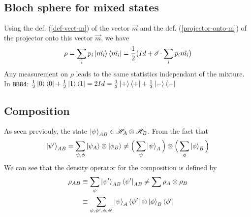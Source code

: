 \documentclass{article}
\begin{document}
\subsection{Bloch sphere for mixed states}
Using the def. (\ref{def-vect-m}) of the vector $\vec{m}$ and the def. (\ref{projector-onto-m})
of the projector onto this vector $\vec{m}$, we have
\begin{equation}
    \rho = \sum_ip_i\ket{\vec{m_i}}\bra{\vec{m_i}} = \frac{1}{2}\big(Id+\vec{\sigma}\cdot\sum_ip_i\vec{m_i}\big)
\end{equation}
Any measurement on $\rho$ leads to the same statistics independant of the mixture.\\
In \texttt{BB84}:
$
\frac{1}{2}\ket{0}\bra{0} + \frac{1}{2} \ket{1}\bra{1}
=2Id=
\frac{1}{2}\ket{+}\bra{+} + \frac{1}{2} \ket{-}\bra{-}
$

\subsection{Composition}
As seen previouly, the state $\ket{\psi}_{AB} \in \mathscr{H}_A \otimes \mathscr{H}_B$.
From the fact that
\begin{equation}
    \ket{\psi'}_{AB} = \sum_{\psi, \phi}\ket{\psi_A}\otimes\ket{\phi_B}
    \neq \Big(\sum_{\psi}\ket{\psi}_A\Big) \otimes \Big(\sum_{\phi}\ket{\phi}_B\Big)
\end{equation}
We can see that the density operator for the composition is defined by
\begin{equation}
    \begin{aligned}
        \rho_{AB}
            & \equiv \sum_{\psi}\ket{\psi'}_{AB}\bra{\psi'}_{AB} \neq \sum \rho_A \otimes \rho_B \\
            & \equiv \sum_{\psi,\psi',\phi,\phi'}\ket{\psi}_A\bra{\psi'}\otimes\ket{\phi}_B\bra{\phi'}
    \end{aligned}
\end{equation}
\end{document}
